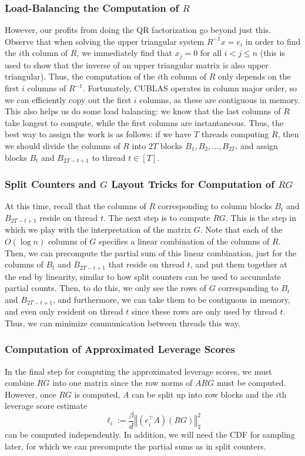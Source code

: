 \documentclass[12pt]{article}
\providecommand{\norm}[1]{\left\Vert#1\right\Vert}
\begin{document}
\subsubsection{Load-Balancing the Computation of $R$}
However, our profits from doing the QR factorization go beyond just this. Observe that when solving the upper triangular system $R^{-1}x = e_i$ in order to find the $i$th column of $R$, we immediately find that $x_j = 0$ for all $i < j\leq n$ (this is used to show that the inverse of an upper triangular matrix is also upper triangular). Thus, the computation of the $i$th column of $R$ only depends on the first $i$ columns of $R^{-1}$. Fortunately, CUBLAS operates in column major order, so we can efficiently copy out the first $i$ columns, as these are contiguous in memory. This also helps us do some load balancing: we know that the last columns of $R$ take longest to compute, while the first columns are instantaneous. Thus, the best way to assign the work is as follows: if we have $T$ threads computing $R$, then we should divide the columns of $R$ into $2T$ blocks $B_1, B_2,\dots, B_{2T}$, and assign blocks $B_t$ and $B_{2T-t+1}$ to thread $t\in[T]$.

\subsubsection{Split Counters and $G$ Layout Tricks for Computation of $RG$}
At this time, recall that the columns of $R$ corresponding to column blocks $B_t$ and $B_{2T-t+1}$ reside on thread $t$. The next step is to compute $RG$. This is the step in which we play with the interpretation of the matrix $G$. Note that each of the $O(\log n)$ columns of $G$ specifies a linear combination of the columns of $R$. Then, we can precompute the partial sum of this linear combination, just for the columns of $B_t$ and $B_{2T-t+1}$ that reside on thread $t$, and put them together at the end by linearity, similar to how split counters can be used to accumulate partial counts. Then, to do this, we only see the rows of $G$ corresponding to $B_t$ and $B_{2T-t+1}$, and furthermore, we can take them to be contiguous in memory, and even only resident on thread $t$ since these rows are only used by thread $t$. Thus, we can minimize communication between threads this way.

\subsubsection{Computation of Approximated Leverage Scores}
In the final step for computing the approximated leverage scores, we must combine $RG$ into one matrix since the row norms of $ARG$ must be computed. However, once $RG$ is computed, $A$ can be split up into row blocks and the $i$th leverage score estimate
\[
	\ell_i := \frac{\beta}{d}\norm{(e_i^\top A)(RG)}_2^2
\]
can be computed independently. In addition, we will need the CDF for sampling later, for which we can precompute the partial sums as in split counters. 
\end{document}
